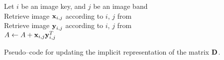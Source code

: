 \vspace{0.4cm}
\begin{algorithm}[H]
    \SetAlgoLined
         {
            Let $i$ be an image key, and $j$ be an image band \\
            Retrieve image $\boldsymbol{\mathbf{x}}_{i,j}$ according to $i$, $j$ from \usno \\
            Retrieve image $\boldsymbol{\mathbf{y}}_{i,j}$ according to $i$, $j$ from \panstarrs \\
            $A \gets A + \boldsymbol{\mathbf{x}}_{i,j}\boldsymbol{\mathbf{y}}_{i,j}^T$ \\
        }
    \caption{Pseudo--code for updating the implicit representation of the matrix $\boldsymbol{\mathbf{D}}$.}
    \label{pscode:update-d:implicit}
\end{algorithm}
\vspace{0.4cm}